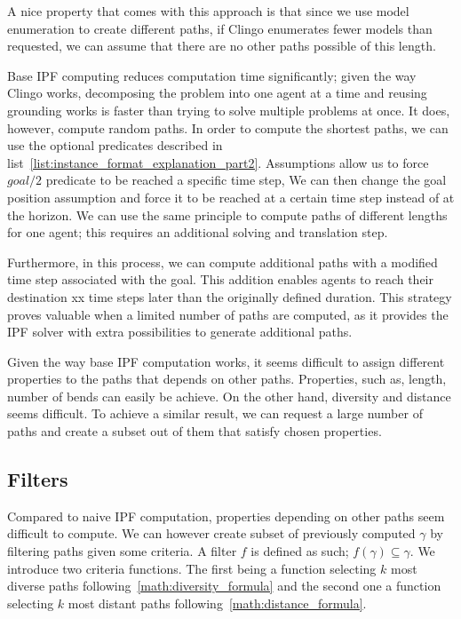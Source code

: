 A nice property that comes with this approach is that since we use model enumeration to create different paths, if Clingo enumerates fewer models than requested, we can assume that there are no other paths possible of this length.

Base IPF computing reduces computation time significantly; given the way Clingo works, decomposing the problem into one agent at a time and reusing grounding works is faster than trying to solve multiple problems at once. It does, however, compute random paths. In order to compute the shortest paths, we can use the optional predicates described in list~\ref{list:instance_format_explanation_part2}. Assumptions allow us to force \(goal/2\) predicate to be reached a specific time step,  We can then change the goal position assumption and force it to be reached at a certain time step instead of at the horizon. We can use the same principle to compute paths of different lengths for one agent; this requires an additional solving and translation step.

Furthermore, in this process, we can compute additional paths with a modified time step associated with the goal. This addition enables agents to reach their destination xx time steps later than the originally defined duration. This strategy proves valuable when a limited number of paths are computed, as it provides the IPF solver with extra possibilities to generate additional paths.

Given the way base IPF computation works, it seems difficult to assign different properties to the paths that depends on other paths. Properties, such as, length, number of bends can easily be achieve. On the other hand, diversity and distance seems difficult. To achieve a similar result, we can request a large number of paths and create a subset out of them that satisfy chosen properties. 






\subsection{Filters}

Compared to naive IPF computation, properties depending on other paths seem difficult to compute. We can however create subset of previously computed \(\gamma\) by filtering paths given some criteria. A filter \(f\) is defined as such; \( f(\gamma) \subseteq \gamma \). We introduce two criteria functions. The first being a function selecting \(k\) most diverse paths following~\ref{math:diversity_formula} and the second one a function selecting \(k\) most distant paths following~\ref{math:distance_formula}.

